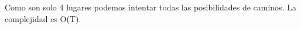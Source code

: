 
Como son solo 4 lugares podemos intentar todas las posibilidades de caminos. La complejidad es O(T).

